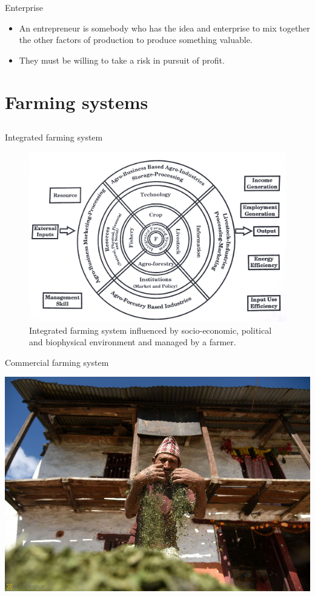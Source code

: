 \documentclass[12pt,ignorenonframetext,aspectratio=169]{beamer}
\providecommand{\tightlist}{%
  \setlength{\itemsep}{0pt}\setlength{\parskip}{0pt}}
\begin{document}
\begin{frame}{Enterprise}
\protect\hypertarget{enterprise}{}
\begin{itemize}
\tightlist
\item
  An entrepreneur is somebody who has the idea and enterprise to mix
  together the other factors of production to produce something
  valuable.
\item
  They must be willing to take a risk in pursuit of profit.
\end{itemize}
\end{frame}

\hypertarget{farming-systems}{%
\section{Farming systems}\label{farming-systems}}

\hypertarget{section-5}{%
\subsection{}\label{section-5}}

\begin{frame}{Integrated farming system}
\protect\hypertarget{integrated-farming-system}{}
\begin{figure}
\includegraphics[width=0.5\linewidth]{./figs/integrated_fs} \caption{Integrated farming system influenced by socio-economic, political and biophysical environment and managed by a farmer.}\label{fig:integrated-fs}
\end{figure}
\end{frame}

\begin{frame}{Commercial farming system}
\protect\hypertarget{commercial-farming-system}{}
\begin{center}\includegraphics[width=0.45\linewidth]{./figs/crop_value_addition} \end{center}
\end{frame}
\end{document}
